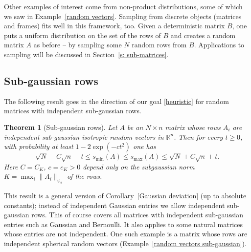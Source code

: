 \documentclass[10pt, openany]{book}
\newtheorem{theorem}{Theorem}[chapter]
\theoremstyle{remark}
\def \R {\mathbb{R}}
\def \psitwo {{\psi_2}}
\def \smin {s_{\min}}
\def \smax {s_{\max}}
\begin{document}
Other examples of interest come from non-product distributions, some of which we saw
in Example~\ref{random vectors}. Sampling from discrete objects (matrices and frames)
fits well in this framework, too. Given a deterministic matrix $B$, one puts a uniform distribution on 
the set of the rows of $B$ and creates 
a random matrix $A$ as before -- by sampling some $N$ random rows from $B$. 
Applications to sampling will be discussed in Section~\ref{s: sub-matrices}.



\subsection{Sub-gaussian rows}	  
		\label{s: sub-gaussian rows}

The following result goes in the direction of our goal \eqref{heuristic} for 
random matrices with independent sub-gaussian rows. 

\begin{theorem}[Sub-gaussian rows]		\label{sub-gaussian rows}
  Let $A$ be an $N \times n$ matrix whose rows $A_i$ are independent
  sub-gaussian isotropic random vectors in $\R^n$.
  Then for every $t \ge 0$, with probability at least $1 - 2\exp(-ct^2)$ one has
  \begin{equation}							\label{smin smax rectangular}
  \sqrt{N} - C \sqrt{n} - t \le \smin(A) \le \smax(A) \le \sqrt{N} + C \sqrt{n} + t.
  \end{equation}
  Here $C = C_K$, $c = c_K > 0$ depend only on the subgaussian norm 
  $K = \max_i \|A_i\|_\psitwo$ of the rows.
\end{theorem}

This result is a general version of Corollary~\ref{Gaussian deviation} (up to absolute constants); 
instead of independent Gaussian entries we allow independent sub-gaussian rows. 
This of course covers all matrices with independent sub-gaussian entries
such as Gaussian and Bernoulli. It also applies to some natural matrices whose entries
are not independent. One such example is a matrix whose rows are independent spherical 
random vectors (Example~\ref{random vectors sub-gaussian}).
\end{document}
